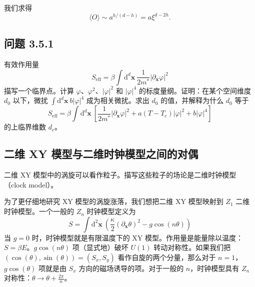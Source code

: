 我们求得
\begin{equation*}
\langle O\rangle \sim a^{h/(d-h)} = a\xi^{d-2h}.
\tag{3.5.2}
\end{equation*}

\subsection*{问题 3.5.1}
有效作用量
\begin{equation*}
S_{\mathrm{eff}} = \beta\int \mathrm{d}^{d}\pmb{x}\ \frac{1}{2m^{*}}|\partial_{\pmb{x}}\varphi|^{2}
\end{equation*}
描写一个临界点。计算 $\varphi$、$\varphi^{2}$、$|\varphi|^{2}$ 和 $|\varphi|^{4}$ 的标度量纲。证明：在某个空间维度 $d_{0}$ 以下，微扰 $\int \mathrm{d}^{d}\pmb{x}\ b|\varphi|^{4}$ 成为相关微扰。求出 $d_{0}$ 的值，并解释为什么 $d_{0}$ 等于
\begin{equation*}
S_{\mathrm{eff}} = \beta\int \mathrm{d}^{d}\pmb{x}\ \left[ \frac{1}{2m^{*}}|\partial_{\pmb{x}}\varphi|^{2} + a(T-T_{c})|\varphi|^{2} + b|\varphi|^{4} \right]
\end{equation*}
的上临界维数 $d_{c}$。

\subsection{二维 XY 模型与二维时钟模型之间的对偶}
\begin{keypoints}
\item 二维 XY 模型中的涡旋可以看作粒子。描写这些粒子的场论是二维时钟模型（clock model）。
\end{keypoints}

为了更仔细地研究 XY 模型的涡旋涨落，我们想把二维 XY 模型映射到 $Z_{1}$ 二维时钟模型。一个一般的 $Z_{n}$ 时钟模型定义为
\begin{equation*}
S = \int \mathrm{d}^{2}\pmb{x}\ \left( \frac{\kappa}{2}(\partial_{\pmb{x}}\theta)^{2} - g\cos(n\theta) \right)
\tag{3.5.3}
\end{equation*}
当 $g = 0$ 时，时钟模型就是有限温度下的 XY 模型。作用量是能量除以温度：$S = \beta E$。$g\cos(n\theta)$ 项（显式地）破坏 $U(1)$ 转动对称性。如果我们把 $(\cos(\theta), \sin(\theta)) = (S_{x}, S_{y})$ 看作自旋的两个分量，那么对于 $n = 1$，$g\cos(\theta)$ 项就是由 $S_{x}$ 方向的磁场诱导的项。对于一般的 $n$，时钟模型具有 $Z_{n}$ 对称性：$\theta \to \theta + \frac{2\pi}{n}$。

